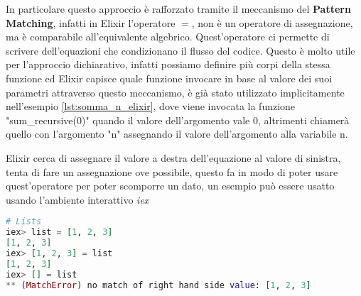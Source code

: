 In particolare questo approccio è rafforzato tramite il meccanismo
del \textbf{Pattern Matching}, infatti in Elixir l'operatore $=$,
non è un operatore di assegnazione, ma è comparabile
all'equivalente algebrico.
Quest'operatore ci permette di scrivere dell'equazioni
che condizionano il flusso del codice.
Questo è molto utile per l'approccio
dichiarativo, infatti possiamo definire più corpi della stessa funzione
ed Elixir capisce quale funzione invocare in base
al valore dei suoi parametri attraverso questo meccanismo,
è già stato utilizzato implicitamente nell'esempio \ref{lst:somma_n_elixir},
dove viene invocata la funzione "sum\_recursive(0)" quando
il valore dell'argomento vale 0, altrimenti chiamerà quello
con l'argomento "n" assegnando il valore dell'argomento alla variabile n.

Elixir cerca di assegnare il valore a destra dell'equazione
al valore di sinistra, tenta di fare un assegnazione ove possibile,
questo fa in modo di poter usare quest'operatore per poter
scomporre un dato, un esempio può essere usatto usando l'ambiente
interattivo \textit{iex}

\begin{lstlisting}[language=elixir, caption={Pattern Matching},captionpos=b,
	label={lst:pattern_matching}]
# Lists
iex> list = [1, 2, 3]
[1, 2, 3]
iex> [1, 2, 3] = list
[1, 2, 3]
iex> [] = list
** (MatchError) no match of right hand side value: [1, 2, 3]
\end{lstlisting}








